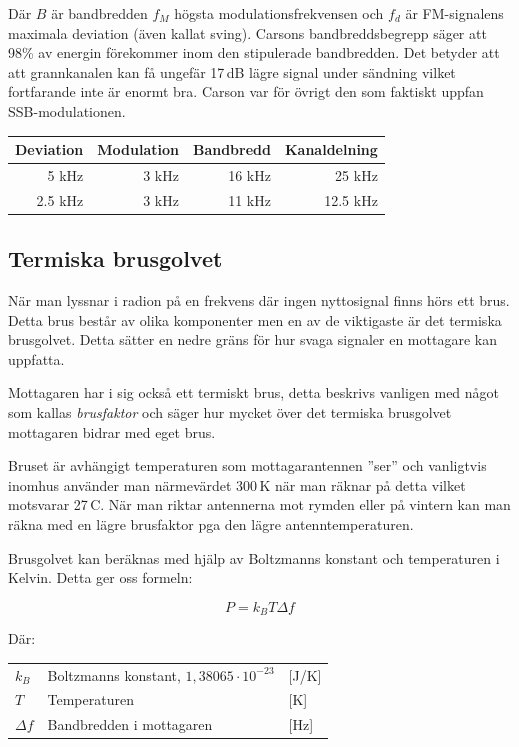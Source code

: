 Där $B$ är bandbredden $f_M$ högsta modulationsfrekvensen och $f_d$ är FM-signalens maximala deviation (även kallat sving). Carsons bandbreddsbegrepp säger att 98\% av energin förekommer inom den stipulerade bandbredden. Det betyder att att grannkanalen kan få ungefär 17\,dB lägre signal under sändning vilket fortfarande inte är enormt bra. Carson var för övrigt den som faktiskt uppfan SSB-modulationen.

\begin{center}
\begin{tabular}{rrrr}
Deviation & Modulation & Bandbredd & Kanaldelning\\ \hline
5 kHz & 3 kHz & 16 kHz & 25 kHz\\
2.5 kHz & 3 kHz & 11 kHz & 12.5 kHz\\
\end{tabular}
\end{center}

\subsection{Termiska brusgolvet}
När man lyssnar i radion på en frekvens där ingen nyttosignal finns hörs ett brus. Detta brus består av olika komponenter men en av de viktigaste är det termiska brusgolvet. Detta sätter en nedre gräns för hur svaga signaler en mottagare kan uppfatta.

Mottagaren har i sig också ett termiskt brus, detta beskrivs vanligen med något som kallas \textit{brusfaktor} och säger hur mycket över det termiska brusgolvet mottagaren bidrar med eget brus. 

Bruset är avhängigt temperaturen som mottagarantennen ''ser'' och vanligtvis inomhus använder man närmevärdet 300\,K när man räknar på detta vilket motsvarar 27\,\textdegree C. När man riktar antennerna mot rymden eller på vintern kan man räkna med en lägre brusfaktor pga den lägre antenntemperaturen.

Brusgolvet kan beräknas med hjälp av Boltzmanns konstant och temperaturen i Kelvin. Detta ger oss formeln:

$$P=k_BT\Delta f$$

Där:

\begin{tabular}{lll}
	$k_B$      & Boltzmanns konstant, $1,38065\cdot 10^{-23}$ & [J/K] \\
	$T$        & Temperaturen                                 & [K]   \\
	$\Delta f$ & Bandbredden i mottagaren                     & [Hz]
\end{tabular}

